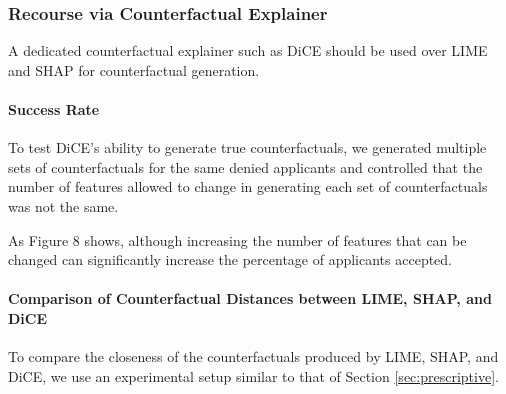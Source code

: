 \documentclass[mnsc,blindrev]{informs3}
\begin{document}
        \subsubsection{Recourse via Counterfactual Explainer}
            \label{cf_recourse}
            A dedicated counterfactual explainer such as DiCE should be used over LIME and SHAP for counterfactual generation.
            

            \paragraph{Success Rate}
                To test DiCE's ability to generate true counterfactuals, we generated multiple sets of counterfactuals for the same denied applicants and controlled that the number of features allowed to change in generating each set of counterfactuals was not the same.

                As Figure 8 shows, although increasing the number of features that can be changed can significantly increase the percentage of applicants accepted.

            

        \paragraph{Comparison of Counterfactual Distances between LIME, SHAP, and DiCE}
        
        To compare the closeness of the counterfactuals produced by LIME, SHAP, and DiCE, we use an experimental setup similar to that of Section \ref{sec:prescriptive}.
            
\end{document}
